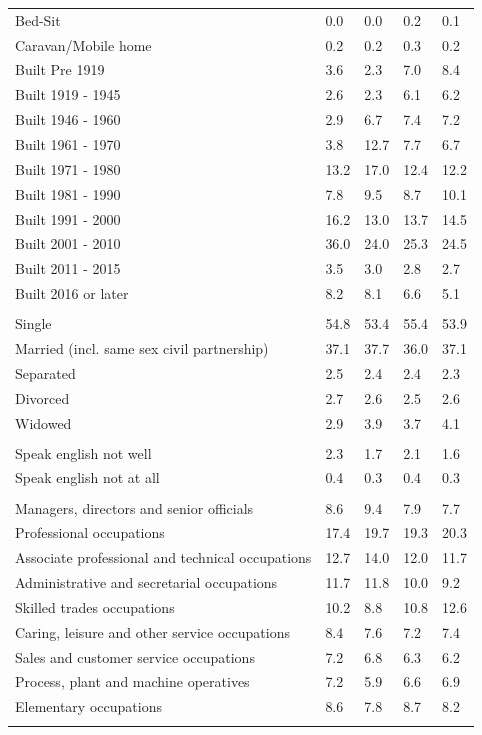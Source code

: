 \documentclass{article}
\begin{document}
\begin{table}[h]
\begin{tabular}{KTTTT}
Bed-Sit & 0.0& 0.0& 0.2& 0.1\\
Caravan/Mobile home & 0.2& 0.2& 0.3& 0.2\\
    \hline
Built Pre 1919 & 3.6& 2.3& 7.0& 8.4\\
Built 1919 - 1945 & 2.6& 2.3& 6.1& 6.2\\
Built  1946 - 1960 & 2.9& 6.7& 7.4& 7.2\\
Built  1961 - 1970 &  3.8& 12.7&  7.7&  6.7\\
Built  1971 - 1980 & 13.2& 17.0& 12.4& 12.2\\
Built  1981 - 1990 &  7.8&  9.5&  8.7& 10.1\\
Built  1991 - 2000 & 16.2& 13.0& 13.7& 14.5\\
Built  2001 - 2010 & 36.0& 24.0& 25.3& 24.5\\
Built  2011 - 2015 & 3.5& 3.0& 2.8& 2.7\\
Built  2016 or later & 8.2& 8.1& 6.6& 5.1\\
\hline
    \\
    \hline
Single & 54.8& 53.4& 55.4& 53.9\\
Married (incl. same sex civil partnership) & 37.1& 37.7& 36.0& 37.1\\
Separated  & 2.5& 2.4& 2.4& 2.3\\
Divorced  & 2.7& 2.6& 2.5& 2.6\\
Widowed & 2.9& 3.9& 3.7& 4.1\\
\hline
    \\ 
    \hline
Speak english not well & 2.3& 1.7& 2.1& 1.6\\
Speak english not at all & 0.4& 0.3& 0.4& 0.3\\
\hline
    \\
    \hline
Managers, directors and senior officials & 8.6& 9.4& 7.9& 7.7\\
Professional occupations & 17.4& 19.7& 19.3& 20.3\\
Associate professional and technical occupations & 12.7& 14.0& 12.0& 11.7\\
Administrative and secretarial occupations & 11.7& 11.8& 10.0&  9.2\\
Skilled trades occupations & 10.2&  8.8& 10.8& 12.6\\
Caring, leisure and other service occupations & 8.4& 7.6& 7.2& 7.4\\
Sales and customer service occupations & 7.2& 6.8& 6.3& 6.2\\
Process, plant and machine operatives & 7.2& 5.9& 6.6& 6.9\\
Elementary occupations & 8.6& 7.8& 8.7& 8.2\\
\hline
\end{tabular}
\end{table}
\end{document}
